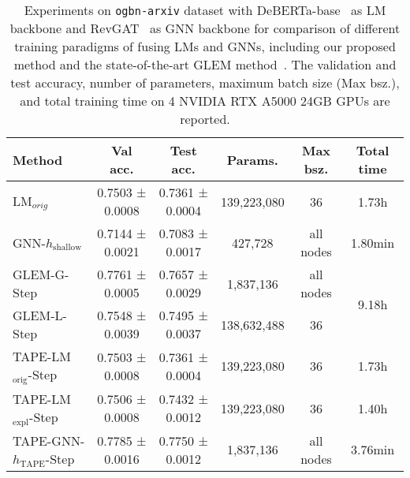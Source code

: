 \documentclass{article}
\begin{document}
\begin{table}[t]
\caption{Experiments on \texttt{ogbn-arxiv} dataset with DeBERTa-base~\citep{he2021deberta} as LM backbone and RevGAT~\citep{li2021training_revgat} as GNN backbone for comparison of different training paradigms of fusing LMs and GNNs, including our proposed method and the state-of-the-art GLEM method~\citep{zhao2022learning_em}.  The validation and test accuracy, number of parameters, maximum batch size (Max bsz.), and total training time on 4 NVIDIA RTX A5000 24GB GPUs are reported. 
}
\label{tab: comparison}
\small
    \centering
    \begin{tabular}{lccccc}
    \toprule
    Method
    &  Val acc. &  Test acc. & Params. & Max bsz. & Total time \\
    \midrule
    LM$_{orig}$
    & 0.7503 ± 0.0008
    & 0.7361 ± 0.0004
    & 139,223,080
    & 36
    & 1.73h \\
    \midrule
    GNN-$h_{\textrm{shallow}}$
    & 0.7144 ± 0.0021
    & 0.7083 ± 0.0017
    & 427,728
    & all nodes
    & 1.80min \\
    \midrule
    GLEM-G-Step
    & 0.7761 ± 0.0005
    & 0.7657 ± 0.0029
    & 1,837,136
    & all nodes
    & \multirow{2}{*}{9.18h} \\
    GLEM-L-Step
    & 0.7548 ± 0.0039
    & 0.7495 ± 0.0037
    & 138,632,488
    & 36
    &\\
    \midrule
    TAPE-LM$_{\textrm{orig}}$-Step
    & 0.7503 ± 0.0008
    & 0.7361 ± 0.0004
    & 139,223,080
    & 36
    & 1.73h\\
    TAPE-LM$_{\textrm{expl}}$-Step
    & 0.7506 ± 0.0008
    & 0.7432 ± 0.0012
    & 139,223,080
    & 36
    & 1.40h\\
    TAPE-GNN-${h_\textrm{TAPE}}$-Step
    & {0.7785 ± 0.0016}
    & 0.7750 ± 0.0012
    & 1,837,136
    & all nodes
    & 3.76min
    \\
    \bottomrule
    \end{tabular}
\end{table}
\end{document}
